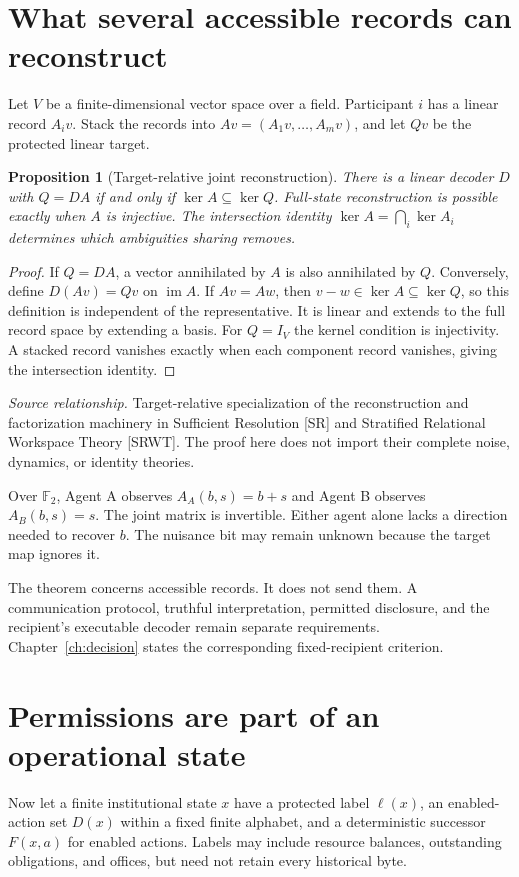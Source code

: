 \documentclass[11pt,oneside,openany]{book}
\newtheorem{proposition}[theorem]{Proposition}
\theoremstyle{definition}\newtheorem{definition}[theorem]{Definition}
\newcommand{\im}{\operatorname{im}}
\newcommand{\source}[1]{\par{\small\textit{Source relationship.} #1}\par}
\begin{document}
\section{What several accessible records can reconstruct}
Let $V$ be a finite-dimensional vector space over a field. Participant $i$ has a linear record $A_i v$. Stack the records into $Av=(A_1v,\ldots,A_mv)$, and let $Qv$ be the protected linear target.

\begin{proposition}[Target-relative joint reconstruction]\label{r:reconstruction}
There is a linear decoder $D$ with $Q=DA$ if and only if $\ker A\subseteq\ker Q$. Full-state reconstruction is possible exactly when $A$ is injective. The intersection identity $\ker A=\bigcap_i\ker A_i$ determines which ambiguities sharing removes.
\end{proposition}
\begin{proof}
If $Q=DA$, a vector annihilated by $A$ is also annihilated by $Q$. Conversely, define $D(Av)=Qv$ on $\im A$. If $Av=Aw$, then $v-w\in\ker A\subseteq\ker Q$, so this definition is independent of the representative. It is linear and extends to the full record space by extending a basis. For $Q=I_V$ the kernel condition is injectivity. A stacked record vanishes exactly when each component record vanishes, giving the intersection identity.
\end{proof}
\source{Target-relative specialization of the reconstruction and factorization machinery in Sufficient Resolution [SR] and Stratified Relational Workspace Theory [SRWT]. The proof here does not import their complete noise, dynamics, or identity theories.}

Over $\mathbb F_2$, Agent A observes $A_A(b,s)=b+s$ and Agent B observes $A_B(b,s)=s$. The joint matrix is invertible. Either agent alone lacks a direction needed to recover $b$. The nuisance bit may remain unknown because the target map ignores it.

The theorem concerns accessible records. It does not send them. A communication protocol, truthful interpretation, permitted disclosure, and the recipient's executable decoder remain separate requirements. Chapter~\ref{ch:decision} states the corresponding fixed-recipient criterion.

\section{Permissions are part of an operational state}
Now let a finite institutional state $x$ have a protected label $\ell(x)$, an enabled-action set $D(x)$ within a fixed finite alphabet, and a deterministic successor $F(x,a)$ for enabled actions. Labels may include resource balances, outstanding obligations, and offices, but need not retain every historical byte.
\end{document}
